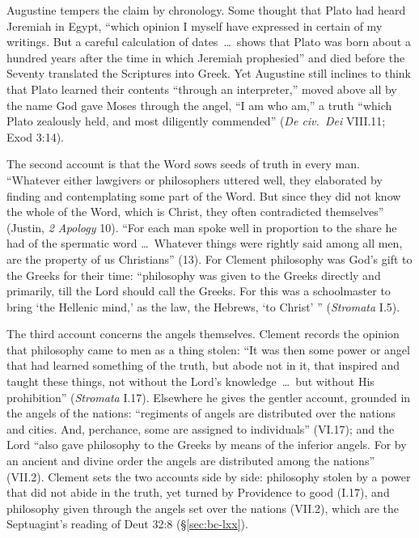 Augustine tempers the claim by chronology. Some thought that Plato had
heard Jeremiah in Egypt, ``which opinion I myself have expressed in
certain of my writings. But a careful calculation of dates~\dots\ shows
that Plato was born about a hundred years after the time in which
Jeremiah prophesied'' and died before the Seventy translated the
Scriptures into Greek. Yet Augustine still inclines to think that Plato
learned their contents ``through an interpreter,'' moved above all by
the name God gave Moses through the angel, ``I am who am,'' a truth
``which Plato zealously held, and most diligently commended''
(\emph{De civ.\ Dei} VIII.11; Exod 3:14).

The second account is that the Word sows seeds of truth in every man.
``Whatever either lawgivers or philosophers uttered well, they
elaborated by finding and contemplating some part of the Word. But since
they did not know the whole of the Word, which is Christ, they often
contradicted themselves'' (Justin, \emph{2 Apology} 10). ``For each man
spoke well in proportion to the share he had of the spermatic word
\dots\ Whatever things were rightly said among all men, are the property
of us Christians'' (13). For Clement philosophy was God's gift to the
Greeks for their time: ``philosophy was given to the Greeks directly and
primarily, till the Lord should call the Greeks. For this was a
schoolmaster to bring `the Hellenic mind,' as the law, the Hebrews, `to
Christ' '' (\emph{Stromata} I.5).

The third account concerns the angels themselves. Clement records the
opinion that philosophy came to men as a thing stolen: ``It was then
some power or angel that had learned something of the truth, but abode
not in it, that inspired and taught these things, not without the Lord's
knowledge~\dots\ but without His prohibition'' (\emph{Stromata} I.17).
Elsewhere he gives the gentler account, grounded in the angels of the
nations: ``regiments of angels are distributed over the nations and
cities. And, perchance, some are assigned to individuals'' (VI.17); and
the Lord ``also gave philosophy to the Greeks by means of the inferior
angels. For by an ancient and divine order the angels are distributed
among the nations'' (VII.2). Clement sets the two accounts side by
side: philosophy stolen by a power that did not abide in the truth, yet
turned by Providence to good (I.17), and philosophy given through the
angels set over the nations (VII.2), which are the Septuagint's reading
of Deut 32:8 (\S\ref{sec:bc-lxx}).

